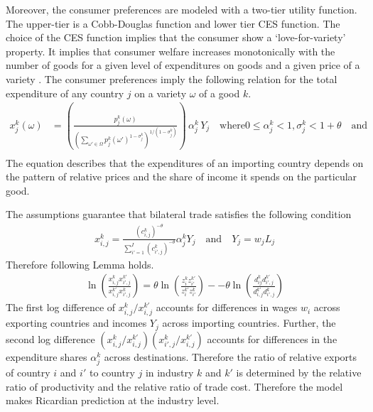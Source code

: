 Moreover, the consumer preferences are modeled with a  two-tier utility function.
 The upper-tier is a Cobb-Douglas function and lower tier CES function.
The choice of the CES function implies that the consumer show a `love-for-variety' property.
It implies that consumer welfare  increases monotonically with the number of goods  for a given level of expenditures on goods and a given price of a variety   \textcite[p. 118]{helpman}. 
The consumer preferences imply the following relation for the total expenditure of any country $j$ on a variety $\omega$ of a good $k$.
\begin{align*}
x^k_{j}(\omega) &=  \left(\frac{ p^k_{j}(\omega) }  {  \left( \sum_{\omega' \in \Omega} {p_j^k (\omega')}^{1-\sigma_j^k } \right)^{1/(1-\sigma_j^k) }}    \right)\, \alpha^k_j \,Y_j \quad \text{where} 0 \leq \alpha_j^k < 1,\sigma_{j}^k<1+\theta \quad \text{and} \, \\
\end{align*}
The equation describes that the expenditures of an importing country  depends on the pattern of relative prices and the share of income it spends on the particular good. \par
The assumptions guarantee that bilateral trade satisfies the following condition  \begin{align} x^k_{i,j}= \frac{(c^k_{i,j})^{ -\theta} } {\sum_{i'=1}^{I}(c^k_{i',j})^{-\theta } }  \alpha^k_j Y_j \quad \text{and}\quad Y_j=w_j  L_j \end{align}
Therefore following Lemma holds. \begin{align} \ln \left( \frac{{x}_{i,j}^k {x}^{k'}_{i',j}}{{x}_{i,j}^{k'} {x}^{k}_{i',j}} \right) = \theta \ln \left( \frac{{z}_{i}^k {z}^{k'}_{i'}}{{z}_{i}^{k'} {z}^{k}_{i'}} \right)--\theta \ln \left( \frac{ d_{ij}^k d^{k'}_{i',j}}{d_{i,j}^{k'} {d}^{k}_{i',j}} \right) \end{align}
The first log difference of ${x_{i,j}^k} /x_{i,j}^{k'}$ accounts for differences in wages $w_i$ across exporting countries and incomes $Y_j$ across importing countries. Further, the second log difference $\left({x_{i,j}^k} /x_{i,j}^{k'} \right)  \left({x_{i',j}^k} /x_{i,j}^{k'} \right) $ accounts for differences in the expenditure shares $\alpha^k_j$ across destinations. Therefore the ratio of relative exports of country $i$ and $i'$ to country $j$ in industry $k$ and $k'$ is determined by the relative ratio of productivity and the relative ratio of trade cost. Therefore the model  makes Ricardian prediction at the industry level.

